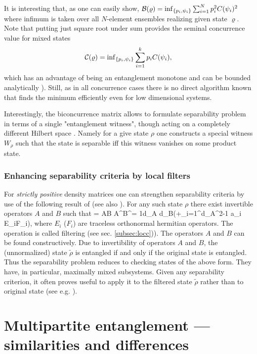 \documentclass[twocolumn,aps,rmp]{revtex4}
\begin{document}
It is interesting that, as one can easily show, ${\cal
B}(\varrho)=\inf_{\{p_{i},\psi_{i}\}}
\sum_{i=1}^{N} p_{i}^{2}C(\psi_{i})^{2}$ where infimum is taken over
all $N$-element ensembles realizing given state $\varrho$.
Note that putting just
square root under sum provides the seminal concurrence value
for mixed states
\begin{equation}
{\cal
  C}(\varrho)={\inf}_{\{p_{i},\psi_{i}\}}
\sum_{i=1}^{k}p_{i}C(\psi_{i}),
\end{equation}
which has an advantage of being an
entanglement monotone and can be bounded analytically
\cite{MintertKB04-conc}).  Still, as in all concurrence cases
there is no direct algorithm known that finds the minimum efficiently
even for low dimensional systems.

Interestingly, the biconcurrence matrix allows to formulate separability problem in terms of a single "entanglement witness", though acting on a completely different Hilbert space
\cite{BadziagHHA-single-wit-2007}. Namely for a give state $\rho$ one constructs a special witness $W_{\rho}$ such that the state is separable iff this witness vanishes on some product state.

\subsubsection{Enhancing separability criteria by local filters}
For {\it strictly positive} density matrices one can strengthen separability criteria
by use of the following result of \cite{LeinaasMO2006}  (see also \cite{VerstraeteDM2003}).
For any such state $\rho$ there exist invertible operators $A$ and $B$ such
that
\be
\tilde \rho = A\ot B \rho A^\dagger \ot B^\dagger=
{1\over d_A d_B}(\id +\sum_{i=1}^{d_A^2-1} a_i E_i\ot F_i),
\ee
where $E_i$ ($F_i$) are traceless orthonormal hermitian operators. The operation is called filtering (see sec. \ref{subsec:locc})).
The operators $A$  and $B$ can be found constructively.
Due to invertibility  of operators $A$ and $B$, the (unnormalized) state $\tilde\rho$ is entangled if and only if the original state
is entangled. Thus the separability problem reduces to checking states of the above form.
They have, in particular, maximally mixed subsystems. Given any separability criterion,  it often proves
useful to apply it to the filtered state $\tilde \rho$ rather than to original state (see e.g. \cite{GuhneHGE2007}).





\section{Multipartite entanglement --- similarities and differences}
\label{MultipartiteEntanglement}
\end{document}
